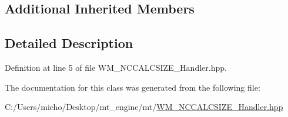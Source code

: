 \subsection*{Additional Inherited Members}


\subsection{Detailed Description}


Definition at line 5 of file W\+M\+\_\+\+N\+C\+C\+A\+L\+C\+S\+I\+Z\+E\+\_\+\+Handler.\+hpp.



The documentation for this class was generated from the following file\+:\begin{DoxyCompactItemize}
\item 
C\+:/\+Users/micho/\+Desktop/mt\+\_\+engine/mt/\hyperlink{_w_m___n_c_c_a_l_c_s_i_z_e___handler_8hpp}{W\+M\+\_\+\+N\+C\+C\+A\+L\+C\+S\+I\+Z\+E\+\_\+\+Handler.\+hpp}\end{DoxyCompactItemize}
